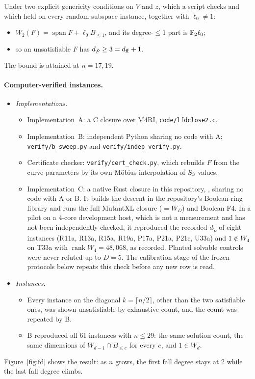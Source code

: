 \begin{proposition}\label{prop:lower3}
Under two explicit genericity conditions on $V$ and $z$, which a script
checks and which held on every random-subspace instance, together with
$\ell_0\ne1$:
\begin{itemize}
\item $W_2(F)=\operatorname{span}F+\ell_0B_{\le1}$, and its degree-$\le1$
  part is $\mathbb{F}_2\ell_0$;
\item so an unsatisfiable $F$ has $d_{\tilde F}\ge3=d_{\rm ff}+1$.
\end{itemize}
The bound is attained at $n=17,19$.
\end{proposition}

\paragraph{Computer-verified instances.}
\begin{itemize}
\item \emph{Implementations.}
  \begin{itemize}
  \item Implementation~A: a C closure over M4RI,
    \texttt{code/lfdclose2.c}.
  \item Implementation~B: independent Python sharing no code with A;
    \texttt{verify/b\_sweep.py} and \texttt{verify/indep\_verify.py}.
  \item Certificate checker: \texttt{verify/cert\_check.py}, which
    rebuilds $F$ from the curve parameters by its own Möbius interpolation
    of $S_{3}$ values.
  \item Implementation~C: a native Rust closure in this repository,
    , sharing no code with A or B. It
    builds the descent in the repository's Boolean-ring library and runs
    the full MutantXL closure ($=W_D$) and Boolean F4. In a pilot on a
    4-core development host, which is not a measurement and has not been
    independently checked, it reproduced the recorded $d_{\tilde F}$ of
    eight instances (R11a, R13a, R15a, R19a, P17a, P21a, P21c, U33a) and
    $1\notin W_4$ on T33a with $\operatorname{rank}W_4=48{,}068$, as
    recorded. Planted solvable controls were never refuted up to $D=5$.
    The calibration stage of the frozen protocols below repeats this
    check before any new row is read.
  \end{itemize}
\item \emph{Instances.}
  \begin{itemize}
  \item Every instance on the diagonal $k=\lceil n/2\rceil$, other than the
    two satisfiable ones, was shown unsatisfiable by exhaustive count, and
    the count was repeated by B.
  \item B reproduced all 61 instances with $n\le29$: the same solution
    count, the same dimensions of $W_{d-1}\cap B_{\le e}$ for every $e$,
    and $1\in W_d$.
  \end{itemize}
\end{itemize}
Figure~\ref{fig:fd} shows the result: as $n$ grows, the first fall degree
stays at 2 while the last fall degree climbs.

